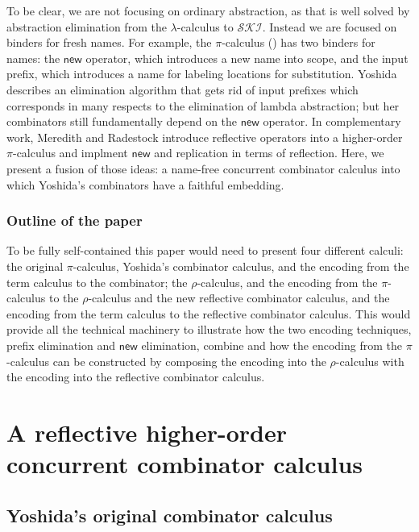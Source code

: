\documentclass{llncs}
\newcommand{\new}{\mathsf{new}}
\newcommand{\pic}{$\pi$-calculus}
\newcommand{\bc}{\mathbin{\mathbf{::=}}}
\newcommand{\bm}{\mathbin{\mathbf\mid}}
\newcommand{\rhoc}{$\rho$-calculus}
\begin{document}
To be clear, we are not focusing on ordinary abstraction, as that is
well solved by abstraction elimination from the $\lambda$-calculus to
$\mathcal{SKI}$. Instead we are focused on binders for fresh
names. For example, the {\pic} (\cite{milner91polyadicpi}) has two
binders for names: the $\new$ operator, which introduces a new name
into scope, and the input prefix, which introduces a name for labeling
locations for substitution.  Yoshida
\cite{DBLP:journals/tcs/Yoshida02} describes an elimination algorithm
that gets rid of input prefixes which corresponds in many respects to
the elimination of lambda abstraction; but her combinators still
fundamentally depend on the $\new$ operator.  In complementary work,
Meredith and Radestock \cite{DBLP:journals/entcs/MeredithR05}
introduce reflective operators into a higher-order {\pic} and implment
$\new$ and replication in terms of reflection.  Here, we present a
fusion of those ideas: a name-free concurrent combinator calculus into
which Yoshida's combinators have a faithful embedding.

\subsubsection{Outline of the paper}
To be fully self-contained this paper would need to present four
different calculi: the original {\pic}, Yoshida's combinator calculus,
and the encoding from the term calculus to the combinator; the
{\rhoc}, and the encoding from the {\pic} to the {\rhoc} and the new
reflective combinator calculus, and the encoding from the term
calculus to the reflective combinator calculus. This would provide all
the technical machinery to illustrate how the two encoding techniques,
prefix elimination and $\new$ elimination, combine and how the
encoding from the {\pic} can be constructed by composing the
encoding into the {\rhoc} with the encoding into the reflective
combinator calculus.

\section{A reflective higher-order concurrent combinator calculus}

\subsection{Yoshida's original combinator calculus}

\end{document}
